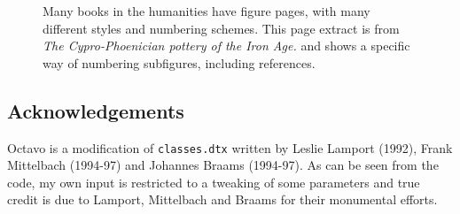 \begin{figure}[htp]
\centering
{\color{thegray}
}
\caption{Many books in the humanities have figure pages, with many different styles and numbering schemes. This page extract is from \textit{The Cypro-Phoenician pottery of the Iron Age. }  \citep{schreiber1971} and shows a specific way of numbering subfigures, including references.}
\end{figure}
\clearpage



 \subsection{Acknowledgements}

 Octavo is a modification of \texttt{classes.dtx} written by Leslie Lamport (1992),
 Frank Mittelbach (1994-97) and Johannes Braams (1994-97). As can be seen
 from the code, my own input is restricted to a tweaking of some parameters
 and true credit is due to Lamport, Mittelbach and Braams for their
 monumental efforts.

